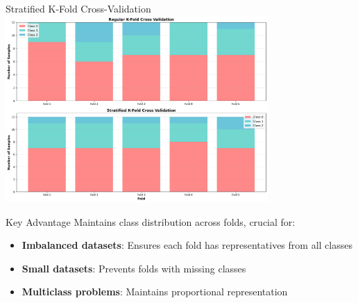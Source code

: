 \documentclass[8pt,aspectratio=1610]{beamer}
\begin{document}
\begin{frame}{Stratified K-Fold Cross-Validation}
\centering
\includegraphics[width=0.75\textwidth]{../figures/stratified_kfold_comparison.png}

\vspace{0.3cm}

\begin{alertblock}{Key Advantage}
Maintains class distribution across folds, crucial for:
\begin{itemize}
\item \textbf{Imbalanced datasets}: Ensures each fold has representatives from all classes
\item \textbf{Small datasets}: Prevents folds with missing classes
\item \textbf{Multiclass problems}: Maintains proportional representation
\end{itemize}
\end{alertblock}
\end{frame}
\end{document}
